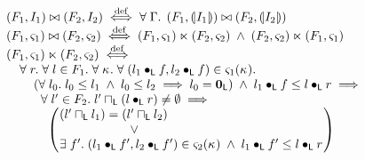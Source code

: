 \begin{definition}[Agreement]
%
\[
\begin{array}{l} 
	(\fence{1}, I_1) \agrees (\fence{2}, I_2) \iffdef \for{\lenv} \left(\fence{1}, \intermediateSemI{I_1}\right) \agrees \left(\fence{2}, \intermediateSemI{I_2}\right)\\
	
	(\fence{1}, \amod{1}) \agrees (\fence{2}, \amod{2}) \iffdef  (\fence{1}, \amod{1}) \respects (\fence{2}, \amod{2}) \;\land\; (\fence{2}, \amod{2}) \respects (\fence{1}, \amod{1}) \\
	

	
	(\fence{1}, \amod{1}) \respects (\fence{2}, \amod{2}) \iffdef \\
	\hspace*{0.2cm} 
	\begin{array}{l}
		\for{r} \for{l \in \fence{1}} \for{\ca{}} \for{(l_1 \composeL f, l_2 \composeL f) \in \amod{1}(\ca{})}  \\
		\hspace*{0.4cm} \left(\for{l_0} l_0 \leq l_1 \;\land\; l_0 \leq l_2 \implies l_0 = \unitL\right)\;\land\; 
		l_1 \composeL f \leq l \composeL r \implies \\
		\hspace*{0.6cm}
		\for{l' \in \fence{2}} l' \meetL (l \composeL r) \not= \emptyset \implies\\
		\hspace*{0.8cm}
		\left(
		\hspace*{-0.15cm}
		\begin{array}{l}
			(l' \meetL l_1) = (l' \meetL l_2)\\
			\hspace*{2cm}\lor\\
			
			\exsts{f'} (l_1 \composeL f', l_2 \composeL f') \in \amod{2}(\ca{}) \;\land\; l_1 \composeL f' \leq l \composeL r
			
		\end{array}
		\hspace*{-0.15cm}
		\right)\\		
		
		


\end{array}
\end{array}\]
\end{definition}
